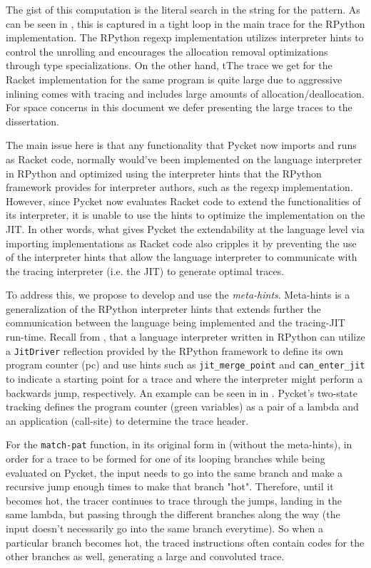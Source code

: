 The gist of this computation is the literal search in the string for
the  pattern. As can be seen in
, this is captured in a tight loop in the
main trace for the RPython implementation. The RPython regexp
implementation utilizes interpreter hints to control the unrolling and
encourages the allocation removal optimizations through type
specializations. On the other hand, tThe trace we get for the Racket
implementation for the same program is quite large due to aggressive
inlining comes with tracing and includes large amounts of
allocation/deallocation. For space concerns in this document we defer
presenting the large traces to the dissertation.

The main issue here is that any functionality that Pycket now imports
and runs as Racket code, normally would've been implemented on the
language interpreter in RPython and optimized using the interpreter
hints that the RPython framework provides for interpreter authors,
such as the regexp implementation. However, since Pycket now evaluates
Racket code to extend the functionalities of its interpreter, it is
unable to use the hints to optimize the implementation on the JIT. In
other words, what gives Pycket the extendability at the language level
via importing implementations as Racket code also cripples it by
preventing the use of the interpreter hints that allow the language
interpreter to communicate with the tracing interpreter (i.e. the JIT)
to generate optimal traces.

To address this, we propose to develop and use the
\emph{meta-hints}. Meta-hints is a generalization of the RPython
interpreter hints that extends further the communication between the
language being implemented and the tracing-JIT run-time. Recall from
, that a language interpreter written in
RPython can utilize a \verb|JitDriver| reflection provided by the
RPython framework to define its own program counter (pc) and use hints
such as \verb|jit_merge_point| and \verb|can_enter_jit| to indicate a
starting point for a trace and where the interpreter might perform a
backwards jump, respectively. An example can be seen in
 in . Pycket's
two-state tracking defines the program counter (green variables) as a
pair of a lambda and an application (call-site) to determine the trace
header.

For the \verb|match-pat| function, in its original form in
 (without the meta-hints), in order for a trace to
be formed for one of its looping branches while being evaluated on
Pycket, the input needs to go into the same branch and make a
recursive jump enough times to make that branch "hot". Therefore,
until it becomes hot, the tracer continues to trace through the jumps,
landing in the same lambda, but passing through the different branches
along the way (the input doesn't necessarily go into the same branch
everytime). So when a particular branch becomes hot, the traced
instructions often contain codes for the other branches as well,
generating a large and convoluted trace.

